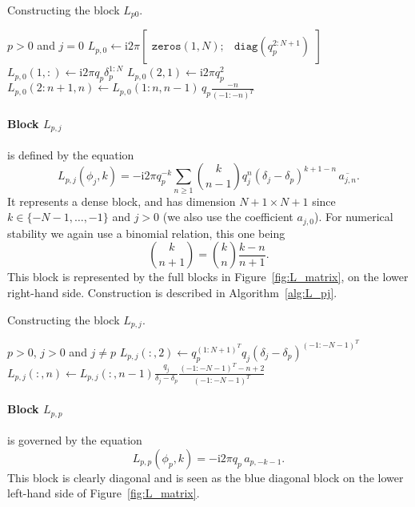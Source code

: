 \documentclass[12pt,a4paper,fleqn]{article}
\newcommand{\conj}[1]{\overline{#1}}
\renewcommand{\i}{\mathrm{i}}
\begin{document}
\begin{algorithm}
  \caption{Constructing the block $L_{p0}$.}
  \label{alg:L_p0}
  \begin{algorithmic}
    \REQUIRE $p > 0$ and $j = 0$
      \STATE $L_{p,0} \leftarrow \i2\pi \begin{bmatrix} \mathtt{zeros}(1,N); & \mathtt{diag}(q_p^{2:N+1}) \end{bmatrix}$
    \ELSE[$\delta_p > 0$]
      \STATE $L_{p,0}(1,:) \leftarrow \i2\pi q_p \delta_p^{1:N}$
      \STATE $L_{p,0}(2,1) \leftarrow \i2\pi q_p^2$
        \STATE $L_{p,0}(2:n+1,n) \leftarrow L_{p,0}(1:n,n-1) \,q_p \frac{-n}{(-1:-n)^T}$
      \ENDFOR
    \ENDIF
  \end{algorithmic}
\end{algorithm}

\paragraph{Block $L_{p,j}$} is defined by the equation
\begin{equation}
  L_{p,j}(\phi_j,k) = -\i2\pi q_p^{-k} \sum_{n\ge 1} \binom{k}{n-1} q_j^n(\delta_j - \delta_p)^{k+1-n} \,\conj{a_{j,n}}.
  \label{eq:block_Lpj}
\end{equation}
It represents a dense block, and has dimension $N+1\times N+1$ since $k\in \{-N-1, \dots, -1\}$ and $j>0$ (we also use the coefficient $a_{j,0}$). For numerical stability we again use a binomial relation, this one being
\begin{equation}
  \binom{k}{n+1} = \binom{k}{n} \frac{k-n}{n+1}.
\end{equation}
This block is represented by the full blocks in Figure~\ref{fig:L_matrix}, on the lower right-hand side. Construction is described in Algorithm~\ref{alg:L_pj}.

\begin{algorithm}
  \caption{Constructing the block $L_{p,j}$.}
  \label{alg:L_pj}
  \begin{algorithmic}
    \REQUIRE $p > 0$, $j>0$ and $j\ne p$
    \STATE $L_{p,j}(:,2) \leftarrow q_p^{(1:N+1)^T} q_j(\delta_j - \delta_p)^{(-1:-N-1)^T}$
    \STATE $L_{p,j}(:,n) \leftarrow L_{p,j}(:,n-1) \frac{q_j}{\delta_j - \delta_p} \frac{(-1:-N-1)^T - n+2}{(-1:-N-1)^T}$
    \ENDFOR
  \end{algorithmic}
\end{algorithm}

\paragraph{Block $L_{p,p}$} is governed by the equation
\begin{equation}
  L_{p,p}(\phi_p,k) = -\i2\pi q_p \,a_{p,-k-1}.
  \label{eq:block_Lpp}
\end{equation}
This block is clearly diagonal and is seen as the blue diagonal block on the lower left-hand side of Figure~\ref{fig:L_matrix}.
\end{document}
